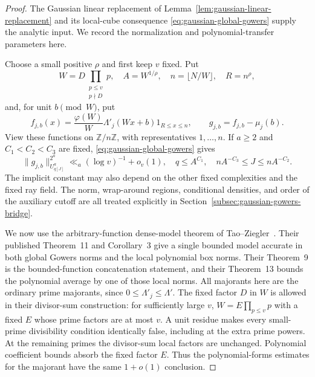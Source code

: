 \documentclass[11pt]{article}
\theoremstyle{definition}
\theoremstyle{remark}
\begin{document}
\begin{proof}
The Gaussian linear replacement of
Lemma~\ref{lem:gaussian-linear-replacement} and its local-cube consequence
\eqref{eq:gaussian-global-gowers} supply the analytic input. We record
the normalization and polynomial-transfer parameters here.

Choose a small positive $\rho$ and first keep $v$ fixed. Put
\[
 W=D\prod_{\substack{p\leq v\\p\nmid D}}p,\quad
 A=W^{1/\rho},\quad n=\lfloor N/W\rfloor,\quad R=n^\rho,
\]
and, for unit $b\pmod W$, put
\[
 f_{j,b}(x)=\frac{\varphi(W)}W\Lambda'_j(Wx+b)1_{R\leq x\leq n},
 \qquad g_{j,b}=f_{j,b}-\mu_j(b).
\]
View these functions on $\mathbb Z/n\mathbb Z$, with representatives
$1,\ldots,n$. If $a\geq2$ and $C_1<C_2<C_3$ are fixed,
\eqref{eq:gaussian-global-gowers} gives
\begin{equation}\label{eq:v5-global-gowers}
 \|g_{j,b}\|_{U^a_{q[J]}}^{2^a}
       \ll_a(\log v)^{-1}+o_v(1),
 \quad q\leq A^{C_1},\quad
 nA^{-C_3}\leq J\leq nA^{-C_2}.
\end{equation}
The implicit constant may also depend on the other fixed complexities
and the fixed ray field. The norm, wrap-around regions, conditional
densities, and order of the auxiliary cutoff are all treated explicitly
in Section~\ref{subsec:gaussian-gowers-bridge}.

We now use the arbitrary-function dense-model theorem of
Tao--Ziegler~\cite{v5tz}. Their published Theorem~11 and Corollary~3
give a single bounded model accurate in both global Gowers norms and the
local polynomial box norms. Their Theorem~9 is the bounded-function
concatenation statement, and their Theorem~13 bounds the polynomial
average by one of those local norms. All majorants here are the ordinary
prime majorants, since $0\leq\Lambda'_j\leq\Lambda'$.
The fixed factor $D$ in $W$ is allowed in their divisor-sum construction:
for sufficiently large $v$, $W=E\prod_{p\leq v}p$ with a fixed $E$ whose
prime factors are at most $v$. A unit residue makes every small-prime
divisibility condition identically false, including at the extra prime
powers. At the remaining primes the divisor-sum local factors are
unchanged. Polynomial coefficient bounds absorb the fixed factor $E$.
Thus the polynomial-forms estimates for the majorant have the same
$1+o(1)$ conclusion.


\end{proof}
\end{document}
